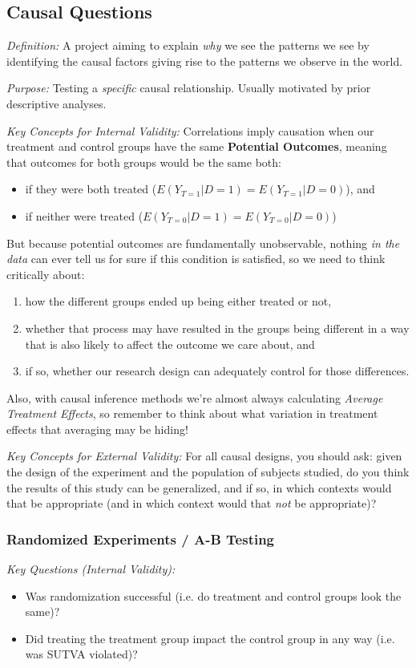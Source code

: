 \documentclass[12pt]{article}
\begin{document}
\subsection*{Causal Questions}

\emph{Definition:} A project aiming to explain \emph{why} we see the patterns we see by identifying the causal factors giving rise to the patterns we observe in the world.

\emph{Purpose:} Testing a \emph{specific} causal relationship. Usually motivated by prior descriptive analyses.

\emph{Key Concepts for Internal Validity:} Correlations imply causation when our treatment and control groups have the same \textbf{Potential Outcomes}, meaning that outcomes for both groups would be the same both:
\begin{itemize}
    \item if they were both treated ($E(Y_{T=1}|D=1) = E(Y_{T=1}|D=0)$), and
    \item if neither were treated ($E(Y_{T=0}|D=1) = E(Y_{T=0}|D=0)$)
\end{itemize}
But because potential outcomes are fundamentally unobservable, nothing \emph{in the data} can ever tell us for sure if this condition is satisfied, so we need to think critically about:
\begin{enumerate}
    \item how the different groups ended up being either treated or not,
    \item whether that process may have resulted in the groups being different in a way that is also likely to affect the outcome we care about, and
    \item if so, whether our research design can adequately control for those differences.
\end{enumerate}

Also, with causal inference methods we're almost always calculating \emph{Average Treatment Effects}, so remember to think about what variation in treatment effects that averaging may be hiding!

\emph{Key Concepts for External Validity:} For all causal designs, you should ask: given the design of the experiment and the population of subjects studied, do you think the results of this study can be generalized, and if so, in which contexts would that be appropriate (and in which context would that \emph{not} be appropriate)?

\subsubsection*{Randomized Experiments / A-B Testing}
\emph{Key Questions (Internal Validity):}
\begin{itemize}
    \item Was randomization successful (i.e. do treatment and control groups look the same)?
    \item Did treating the treatment group impact the control group in any way (i.e. was SUTVA violated)?
\end{itemize}
\end{document}
